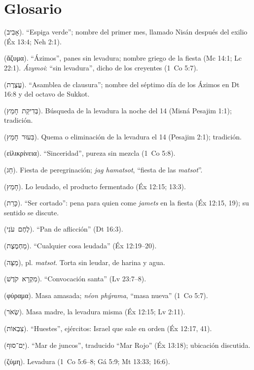 \documentclass[11pt,letterpaper]{article}
\newcommand{\heb}[1]{\mbox{\foreignlanguage{hebrew}{#1}}}
\newcommand{\grc}[1]{\foreignlanguage{ancientgreek}{#1}}
\begin{document}
\section*{Glosario}
\begin{description}\footnotesize\setlength{\itemsep}{0pt}
\item[Abib] (\heb{אָבִיב}). ``Espiga verde''; nombre del primer mes, llamado Nisán después del exilio (Éx 13:4; Neh 2:1).
\item[\emph{Ázyma}] (\grc{ἄζυμα}). ``Ázimos'', panes sin levadura; nombre griego de la fiesta (Mc 14:1; Lc 22:1). \emph{Ázymoi}: ``sin levadura'', dicho de los creyentes (1~Co 5:7).
\item[\emph{Atséret}] (\heb{עֲצֶרֶת}). ``Asamblea de clausura''; nombre del séptimo día de los Ázimos en Dt 16:8 y del octavo de Sukkot.
\item[\emph{Bedikat jamets}] (\heb{בְּדִיקַת חָמֵץ}). Búsqueda de la levadura la noche del 14 (Misná Pesajim 1:1); tradición.
\item[\emph{Biur jamets}] (\heb{בִּעוּר חָמֵץ}). Quema o eliminación de la levadura el 14 (Pesajim 2:1); tradición.
\item[\emph{Eilikríneia}] (\grc{εἰλικρίνεια}). ``Sinceridad'', pureza sin mezcla (1~Co 5:8).
\item[\emph{Jag}] (\heb{חַג}). Fiesta de peregrinación; \emph{jag hamatsot}, ``fiesta de las \emph{matsot}''.
\item[\emph{Jamets}] (\heb{חָמֵץ}). Lo leudado, el producto fermentado (Éx 12:15; 13:3).
\item[\emph{Karet}] (\heb{כָּרֵת}). ``Ser cortado'': pena para quien come \emph{jamets} en la fiesta (Éx 12:15, 19); su sentido se discute.
\item[\emph{Lejem oni}] (\heb{לֶחֶם עֹנִי}). ``Pan de aflicción'' (Dt 16:3).
\item[\emph{Majméset}] (\heb{מַחְמֶצֶת}). ``Cualquier cosa leudada'' (Éx 12:19--20).
\item[\emph{Matsá}] (\heb{מַצָּה}), pl. \emph{matsot}. Torta sin leudar, de harina y agua.
\item[\emph{Mikrá kódesh}] (\heb{מִקְרָא קֹדֶשׁ}). ``Convocación santa'' (Lv 23:7--8).
\item[\emph{Phýrama}] (\grc{φύραμα}). Masa amasada; \emph{néon phýrama}, ``masa nueva'' (1~Co 5:7).
\item[\emph{Se'or}] (\heb{שְׂאֹר}). Masa madre, la levadura misma (Éx 12:15; Lv 2:11).
\item[\emph{Tsiv'ot}] (\heb{צִבְאוֹת}). ``Huestes'', ejércitos: Israel que sale en orden (Éx 12:17, 41).
\item[\emph{Yam Suf}] (\heb{יַם־סוּף}). ``Mar de juncos'', traducido ``Mar Rojo'' (Éx 13:18); ubicación discutida.
\item[\emph{Zýmē}] (\grc{ζύμη}). Levadura (1~Co 5:6--8; Gá 5:9; Mt 13:33; 16:6).
\end{description}
\end{document}
